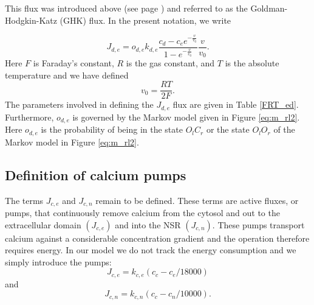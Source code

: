  This flux was introduced above (see page \pageref{GHK}) and referred to as the Goldman-Hodgkin-Katz (GHK) flux. In the present notation, we write

\begin{equation}
J_{d,e}=o_{d,e} k_{d,e} \frac{c_d-c_{e}e^{-\frac{v}{v_0}}}{1-e^{-\frac{v}{v_0}}}\frac{v}{v_0}.\label{J_ed}%
\end{equation}
Here %
$F$ is Faraday's constant, $R$ is the gas constant,
and $T$ is the absolute temperature and we have defined
\[
v_0=\frac{RT}{2F}.%
\]
 The parameters involved in defining the $J_{d,e}$ flux are given in Table \ref{FRT_ed}. Furthermore, $o_{d,e}$ is governed by the Markov model 
 given in Figure \ref{eq:m_rl2}. Here $o_{d,e}$ is the probability of being in the state $O_lC_r$ or the state $O_lO_r$ of the Markov model
  in Figure \ref{eq:m_rl2}.

 
 




\subsection{Definition of calcium pumps}


The terms $J_{c,e}$ and $J_{c,n}$ remain to be defined. These terms are active
fluxes, or pumps, that continuously remove calcium from the cytosol
and out to the extracellular domain $(J_{c,e})$ and into the NSR $(J_{c,n}).$
These pumps transport calcium against a considerable concentration gradient and
the operation therefore requires energy. In our model we do not track the
energy consumption and we simply introduce the pumps:%
\begin{equation}
J_{c,e}=k_{c,e} (c_c-c_e/18000)  \label{J_ce}
\end{equation}
and%
\begin{equation}
J_{c,n}= k_{c,n} (c_c-c_n/10000).  \label{J_cn}
\end{equation}


